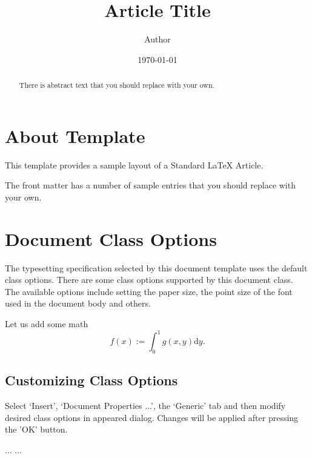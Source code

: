 \documentclass{article}
\begin{document}
\title{Article Title}
\author{Author}
\date{\today}
\maketitle

\begin{abstract}
    There is abstract text that you should replace with your own. 
\end{abstract}

\tableofcontents

\section{About Template}
This template provides a sample layout of a Standard \LaTeX{} Article.

The front matter has a number of sample entries that you should replace
with your own. 

\section{Document Class Options}
The typesetting specification selected by this document template
uses the default class options. There are some class options 
supported by this document class. The available options include 
setting the paper size, the point size of the font used in the 
document body and others.

Let us add some math
$$f(x):=\int_0^1 g(x,y)\mathrm{d}y.$$

\subsection{Customizing Class Options}
Select `Insert', `Document Properties ...', the `Generic' tab
and then modify desired class options in appeared dialog.
Changes will be applied after pressing the 'OK' button.

\begin{thebibliography}{99}
 ...
 ...
\end{thebibliography}
\end{document}
